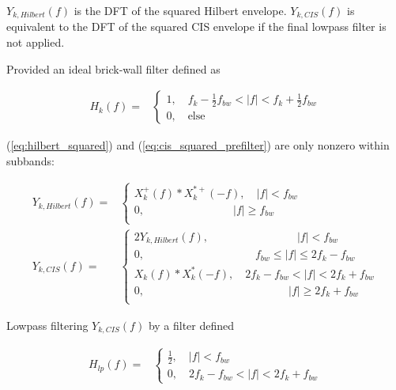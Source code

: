 \documentclass [11pt, proquest,oneside] {ganter_thesis}[2015/03/03]
\begin{document}
$Y_{k,Hilbert}(f)$ is the DFT of the squared Hilbert envelope.  $Y_{k,CIS}(f)$ is equivalent to the DFT of the squared CIS envelope if the final lowpass filter is not applied.

Provided an ideal brick-wall filter defined as

\begin{align}
H_k(f) =& \left\{
                \begin{array}{ll}
                1, \quad f_k - \frac{1}{2} f_{bw} < |f| < f_k + \frac{1}{2} f_{bw} \\
                0, \quad \mathrm{else}
                \end{array}
              \right.
\end{align}

(\ref{eq:hilbert_squared}) and (\ref{eq:cis_squared_prefilter}) are only nonzero within subbands:

\begin{align}
Y_{k,Hilbert}(f) =& \left\{
			 \begin{array}{ll}
X^+_{k}(f) * X^{*+}_{k}(-f), \quad |f| < f_{bw} \\
0, \qquad \qquad \qquad \qquad |f| \geq f_{bw} \\
                \end{array}
               \right. \\
\label{eq:y_k_cis}
Y_{k,CIS}(f) =& \left\{
			 \begin{array}{ll}
2Y_{k,Hilbert}(f), \quad \qquad \qquad \qquad \quad |f| < f_{bw} \\
0, \qquad \qquad \qquad \qquad \qquad  f_{bw} \leq |f| \leq 2f_k - f_{bw}  \\
X_{k}(f) * X^*_{k}(-f), \quad 2f_k - f_{bw} < |f| < 2f_k + f_{bw} \\
0, \qquad \qquad \qquad \qquad \qquad \quad \qquad |f| \geq 2f_k + f_{bw}  \\
                \end{array}
               \right.
\end{align}

Lowpass filtering $Y_{k,CIS}(f)$ by a filter defined

\begin{align}
H_{lp}(f) =& \left\{
                \begin{array}{ll}
                \frac{1}{2}, \quad |f| < f_{bw} \\
                 0, \quad 2f_k - f_{bw} < |f| < 2f_k + f_{bw}
                \end{array}
              \right.
\end{align}
\end{document}
